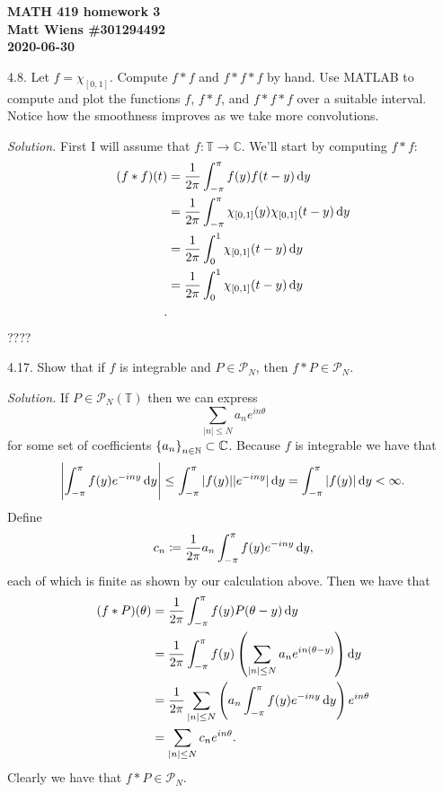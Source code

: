 \documentclass{article}
\newcommand{\Pc}{\mathcal{P}}
\newcommand{\T}{\mathbb{T}}
\newcommand{\C}{\mathbb{C}}
\newcommand{\N}{\mathbb{N}}
\begin{document}
\textbf{MATH 419 homework 3} \\
\textbf{Matt Wiens \#301294492} \\
\textbf{2020-06-30}

4.8. Let $f = \chi_{[0, 1]}$. Compute $f * f$ and $f * f * f$ by hand.
Use MATLAB to compute and plot the functions $f$, $f * f$, and
$f * f * f$ over a suitable interval. Notice how the smoothness improves
as we take more convolutions.

\textit{Solution.}
First I will assume that $f: \T \to \C$. We'll start by computing
$f * f$:
%
\begin{align*}
    (f * f)(t)
        &= \frac{1}{2 \pi} \int_{-\pi}^\pi f(y) f(t - y) \dif y \\
        &= \frac{1}{2 \pi} \int_{-\pi}^\pi \chi_{[0, 1]}(y) \chi_{[0, 1]}(t - y) \dif y \\
        &= \frac{1}{2 \pi} \int_0^1 \chi_{[0, 1]}(t - y) \dif y \\
        &= \frac{1}{2 \pi} \int_0^1 \chi_{[0, 1]}(t - y) \dif y \\
    .
\end{align*}
????

\newpage

4.17. Show that if $f$ is integrable and $P \in \Pc_N$, then $f * P \in \Pc_N$.

\textit{Solution.}
If $P \in \Pc_N(\T)$ then we can express
%
\begin{equation*}
    \sum_{|n| \leq N} a_n e^{i n \theta}
\end{equation*}
%
for some set of coefficients $\cbr{a_n}_{n \in \N} \subset \C$. Because
$f$ is integrable we have that
%
\begin{equation*}
    \envert{\int_{-\pi}^\pi f(y) e^{-i n y} \dif y}
    \leq \int_{-\pi}^\pi |f(y)| |e^{-i n y}| \dif y
    = \int_{-\pi}^\pi |f(y)| \dif y
    < \infty
    .
\end{equation*}
%
Define
%
\begin{equation*}
    c_n \coloneqq \frac{1}{2 \pi} a_n \int_{-\pi}^\pi f(y) e^{-i n y} \dif y
    ,
\end{equation*}
%
each of which is finite as shown by our calculation above. Then we have that
%
\begin{align*}
    (f * P) (\theta)
        &= \frac{1}{2 \pi} \int_{-\pi}^\pi f(y) P(\theta - y) \dif y \\
        &= \frac{1}{2 \pi} \int_{-\pi}^\pi f(y) \del{\sum_{|n| \leq N} a_n e^{i n (\theta - y)}} \dif y \\
        &= \frac{1}{2 \pi} \sum_{|n| \leq N} \del{a_n  \int_{-\pi}^\pi f(y) e^{-i n y} \dif y} e^{i n \theta} \\
        &= \sum_{|n| \leq N} c_n e^{i n \theta}
        .
\end{align*}
%
Clearly we have that $f * P \in \Pc_N$.
\end{document}
